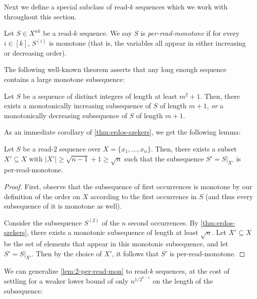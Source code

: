 \documentclass[11pt]{article}
\begin{document}
Next we define a special subclass of read-$k$ sequences which we work with throughout this section.

\begin{definition}
Let $S \in X^{nk}$ be a read-$k$ sequence. We say $S$ is {\em per-read-monotone} if for every $i \in [k]$, $S^{(i)}$ is monotone (that is, the variables all appear in either increasing or decreasing order).
\end{definition}


The following well-known theorem asserts that any long enough sequence contains a large monotone subsequence:

\begin{theorem}
\label{thm:erdos-szekers}
Let $S$ be a sequence of distinct integers of length at least $m^2+1$. Then, there exists a monotonically increasing subsequence of $S$ of length $m+1$, \emph{or} a monotonically decreasing subsequence of $S$ of length $m+1$.
\end{theorem}

As an immediate corollary of \autoref{thm:erdos-szekers}, we get the following lemma:
\begin{lemma}
\label{lem:2-per-read-mon}
Let $S$ be a read-$2$ sequence over $X=\{x_1, \ldots, x_n\}$. Then, there exists a subset $X' \subseteq X$ with $|X'| \ge \sqrt{n-1} +1 \ge \sqrt{n}$ such that the subsequence $S'=S|_{X'}$ is per-read-monotone.
\end{lemma}

\begin{proof}
First, observe that the subsequence of first occurrences is monotone by our definition of the order on $X$ according to the first occurrence in $S$ (and thus every subsequence of it is monotone as well).

Consider the subsequence $S^{(2)}$ of the $n$ second occurrences. By \autoref{thm:erdos-szekers}, there exists a monotonic subsequence of length at least $\sqrt{n}$. Let $X' \subseteq X$ be the set of elements that appear in this monotonic subsequence, and let $S'=S|_{X'}$. Then by the choice of $X'$, it follows that $S'$ is per-read-monotone.
\end{proof}


We can generalize \autoref{lem:2-per-read-mon} to read-$k$ sequences, at the cost of settling for a weaker lower bound of only $n^{1/2^{k-1}}$ on the length of the subsequence:
\end{document}
